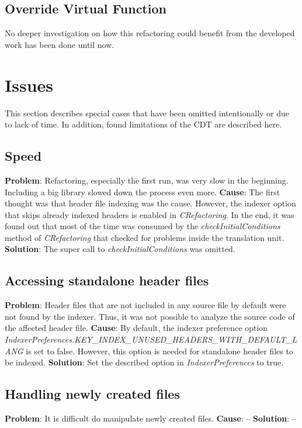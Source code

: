 \subsection{Override Virtual Function}
No deeper investigation on how this refactoring could benefit from the developed 
work has been done until now.

\section{Issues}

This section describes special cases that have been omitted intentionally or due 
to lack of time. In addition, found limitations of the CDT are described here.

\subsection{Speed}
\textbf{Problem}: Refactoring, especially the first run, was very slow in the 
beginning. Including a big library slowed down the process even more.
\textbf{Cause}: The first thought was that header file indexing was the cause. 
However, the indexer option that skips already indexed headers is enabled in 
\textit{CRefactoring}. In the end, it was found out that most of the time was 
consumed by the \textit{checkInitialConditions} method of \textit{CRefactoring} 
that checked for problems inside the translation unit.
\textbf{Solution}: The super call to \textit{checkInitialConditions} was omitted.

\subsection{Accessing standalone header files}
\textbf{Problem}: Header files that are not included in any source file by 
default were not found by the indexer. Thus, it was not possible to analyze the 
source code of the affected header file.
\textbf{Cause}: By default, the indexer preference option 
\textit{IndexerPreferences.KEY\_INDEX\_UNUSED\_HEADERS\_WITH\_DEFAULT\_LANG} is 
set to false. However, this option is needed for standalone header files to be 
indexed.
\textbf{Solution}: Set the described option in \textit{IndexerPreferences} to 
true.

\subsection{Handling newly created files}
\textbf{Problem}: It is difficult do manipulate newly created files.
\textbf{Cause}: --
\textbf{Solution}: --

